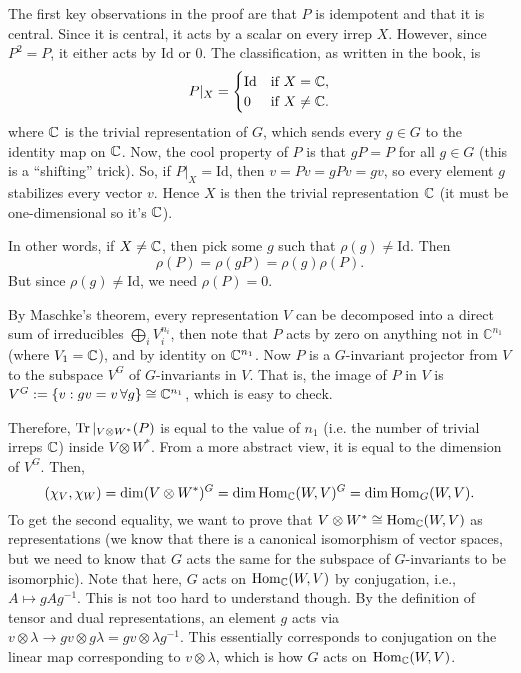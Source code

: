 \documentclass[oneside]{scrbook}
\newcommand{\Id}{\text{Id}}
\begin{document}
The first key observations in the proof are that $P$ is idempotent and that it is central. Since it is central, it acts by a scalar on every irrep $X$. However, since $P^2=P$, it either acts by $\Id$ or $0$. The classification, as written in the book, is
\[P|_X=\begin{cases}
\Id & \text{if } X=\CC,\\
0 & \text{if } X\neq \CC.
\end{cases}\]
where $\mathbb C$ is the trivial representation of $G$, which sends every $g\in G$ to the identity map on $\mathbb C$. Now, the cool property of $P$ is that $gP=P$ for all $g\in G$ (this is a ``shifting'' trick). So, if $P|_X=\Id$, then $v=Pv=gPv=gv$, so every element $g$ stabilizes every vector $v$. Hence $X$ is then the trivial representation $\mathbb C$ (it must be one-dimensional so it's $\mathbb C$).

In other words, if $X\neq \mathbb C$, then pick some $g$ such that $\rho(g)\neq \Id$. Then
\[\rho(P)=\rho(gP)=\rho(g)\rho(P).\]
But since $\rho(g)\neq \Id$, we need $\rho(P)=0$.

By Maschke's theorem, every representation $V$ can be decomposed into a direct sum of irreducibles $\bigoplus_i V_i^{n_i}$, then note that $P$ acts by zero on anything not in $\mathbb{C}^{n_1}$ (where $V_1=\mathbb C$), and by identity on $\mathbb C^{n_1}$. Now $P$ is a $G$-invariant projector from $V$ to the subspace $V^G$ of $G$-invariants in $V$. That is, the image of $P$ in $V$ is $V^G:=\{v:gv=v\, \forall g\}\cong \mathbb C^{n_1}$, which is easy to check. 

Therefore, $\operatorname{Tr}|_{V\otimes W^*}(P)$ is equal to the value of $n_1$ (i.e. the number of trivial irreps $\mathbb C$) inside $V\otimes W^*$. From a more abstract view, it is equal to the dimension of $V^G$. Then,
\[(\chi_V,\chi_W)=\dim(V\otimes W^*)^G=\dim \operatorname{Hom}_\mathbb C(W,V)^G=\dim \operatorname{Hom}_G(W,V).\]
To get the second equality, we want to prove that $V\otimes W^{*}\cong \operatorname{Hom}_{\mathbb C}(W,V)$ as representations (we know that there is a canonical isomorphism of vector spaces, but we need to know that $G$ acts the same for the subspace of $G$-invariants to be isomorphic). Note that here, $G$ acts on $\operatorname{Hom}_{\mathbb C}(W,V)$ by conjugation, i.e., $A\mapsto gAg^{-1}$. This is not too hard to understand though. By the definition of tensor and dual representations, an element $g$ acts via $v\otimes \lambda \to gv\otimes g\lambda=gv\otimes \lambda g^{-1}$. This essentially corresponds to conjugation on the linear map corresponding to $v\otimes \lambda$, which is how $G$ acts on $\operatorname{Hom}_{\mathbb C}(W,V)$. 
\end{document}
